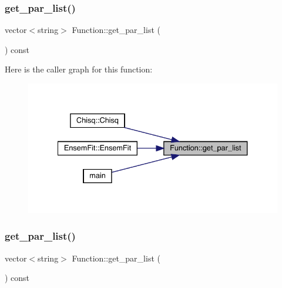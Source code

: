 \mbox{\label{classFunction_a77c4395678c3ad7435ef23a661e3ff6d}} 
\subsubsection{\texorpdfstring{get\_par\_list()}{get\_par\_list()}\hspace{0.1cm}{\footnotesize\ttfamily [1/2]}}
{\footnotesize\ttfamily vector$<$string$>$ Function\+::get\+\_\+par\+\_\+list (\begin{DoxyParamCaption}{ }\end{DoxyParamCaption}) const\hspace{0.3cm}{\ttfamily [inline]}}

Here is the caller graph for this function\+:
\nopagebreak
\begin{figure}[H]
\begin{center}
\leavevmode
\includegraphics[width=334pt]{de/d65/classFunction_a77c4395678c3ad7435ef23a661e3ff6d_icgraph}
\end{center}
\end{figure}
\mbox{\label{classFunction_a77c4395678c3ad7435ef23a661e3ff6d}} 
\subsubsection{\texorpdfstring{get\_par\_list()}{get\_par\_list()}\hspace{0.1cm}{\footnotesize\ttfamily [2/2]}}
{\footnotesize\ttfamily vector$<$string$>$ Function\+::get\+\_\+par\+\_\+list (\begin{DoxyParamCaption}{ }\end{DoxyParamCaption}) const\hspace{0.3cm}{\ttfamily [inline]}}

